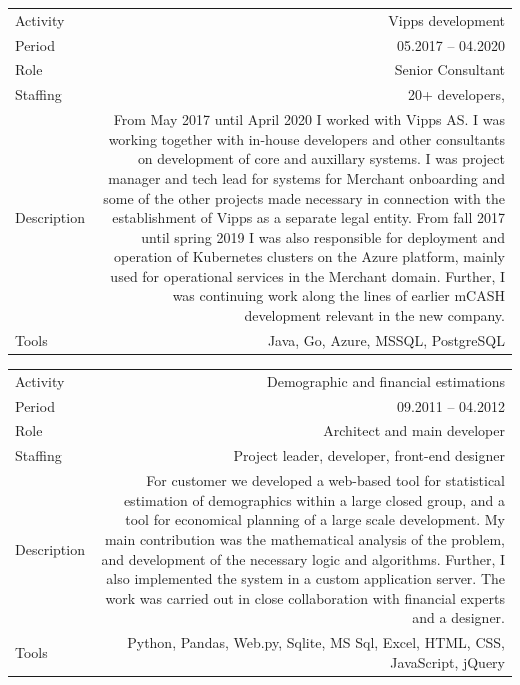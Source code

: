 \documentclass[english,a4paper,11pt]{article}
\begin{document}
\begin{longtable}{@{}LR}
Activity & Vipps development \\ 
Period & 05.2017 -- 04.2020 \\ 
Role & Senior Consultant \\ 
Staffing & 20+ developers, \\ 
Description & From May 2017 until April 2020 I worked with Vipps AS. I was working together with in-house developers and other consultants on development of core and auxillary systems. I was project manager and tech lead for systems for Merchant onboarding and some of the other projects made necessary in connection with the establishment of Vipps as a separate legal entity. From fall 2017 until spring 2019 I was also responsible for deployment and operation of Kubernetes clusters on the Azure platform, mainly used for operational services in the Merchant domain. Further, I was continuing work along the lines of earlier mCASH development relevant in the new company. \\ 
Tools & Java, Go, Azure, MSSQL, PostgreSQL \\ 
\end{longtable}

\begin{longtable}{@{}LR}
Activity & Demographic and financial estimations \\ 
Period & 09.2011 -- 04.2012 \\ 
Role & Architect and main developer \\ 
Staffing & Project leader, developer, front-end designer \\ 
Description & For customer we developed a web-based tool for statistical estimation of demographics within a large closed group, and a tool for economical planning of a large scale development. My main contribution was the mathematical analysis of the problem, and development of the necessary logic and algorithms. Further, I also implemented the system in a custom application server. The work was carried out in close collaboration with financial experts and a designer. \\ 
Tools & Python, Pandas, Web.py, Sqlite, MS Sql, Excel, HTML, CSS, JavaScript, jQuery \\ 
\end{longtable}
\end{document}
